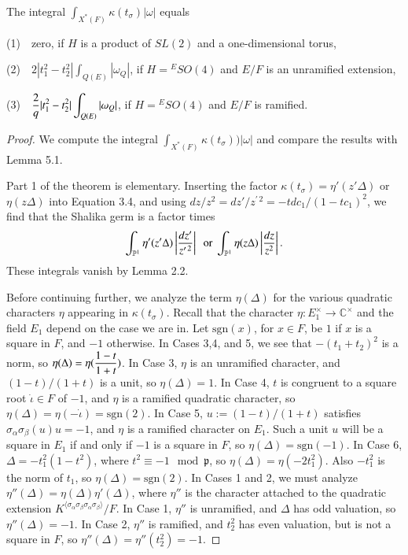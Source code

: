 \documentclass{amsart}
\newcommand\jota{{\dot\iota}}
\newcommand\bP{{\mathbb P}}
\newcommand\pp{{\mathfrak p}}
\newcommand\C{{\mathbb C}}
\newenvironment{cthm}[1]
  {\renewcommand\thethm{\bf #1}\thm}
  {\endthm}
\begin{document}
\bigskip
\noindent
\begin{cthm}{Theorem 5.2} The integral 
$\int_{X^*(F)} \kappa(t_\sigma)|\omega|$ equals

\noindent
(1)\ \
  zero, if $H$ is a product of $SL(2)$ and a one-dimensional torus,

\noindent
(2)\ \  $\displaystyle 2 |t_1^2-t_2^2| \int_{Q(E)} |\omega_Q|$, if
$H = {}^ESO(4)$ and $E/F$ is an unramified extension,

\noindent
(3)\ \  $\displaystyle{2\over q} |t_1^2-t_2^2| \int_{Q(E)} |\omega_Q|$, if
$H = {}^ESO(4)$ and $E/F$ is ramified.
\end{cthm}

\bigskip
\noindent
\begin{proof}  We compute the integral $\int_{X^*(F)} \kappa(t_\sigma))
|\omega|$ and compare the results with Lemma 5.1.

Part 1 of the theorem is elementary.
Inserting the factor $\kappa(t_\sigma) = \eta'(z'\Delta)$ or
$\eta(z\Delta)$
into
Equation 3.4, and using $dz/z^2= dz'/z^{\prime\,2}
 = -t dc_1/(1 - t c_1)^2$, we find
that the Shalika germ is a factor times
$$ \int_{\bP^1} \eta'(z' \Delta) \left|
{ dz'\over z^{\prime\,2}}\right | \ \text{ or }
\int_{\bP^1} \eta(z \Delta) \left|
{ dz\over z^2}\right |.$$
These integrals vanish by Lemma 2.2.

Before continuing further, we analyze the term $\eta(\Delta)$
for the various quadratic characters $\eta$ appearing in
$\kappa(t_\sigma)$.  Recall that the character 
$\eta:E_1^\times\to\C^\times$ and the field $E_1$ 
depend on the case we are in.  Let $\text{sgn}(x)$, for
$x\in F$, be $1$ if $x$ is a square in $F$, and $-1$
otherwise.
In Cases 3,4, and 5, we see that $-(t_1+t_2)^2$ is a norm,
so $\eta(\Delta)=\eta(\displaystyle{1-t\over 1+t})$.
In Case 3, $\eta$ is an unramified character, and
$(1-t)/(1+t)$ is a unit, so $\eta(\Delta)=1$.  In Case 4,
$t$ is congruent to a square root $\jota\in F$ of $-1$, and
$\eta$ is a ramified quadratic character, so
$\eta(\Delta)=\eta(-\jota) = \text{sgn}(2)$.  In Case 5,
$u:= (1-t)/(1+t)$ satisfies $\sigma_{\alpha}\sigma_\beta(u)u= -1$,
and $\eta$ is a ramified character on $E_1$.  Such a unit 
$u$ will be a square in $E_1$ if and only if $-1$ is a square in $F$,
so $\eta(\Delta) = \text{sgn}(-1)$.
In Case 6, $\Delta = -t_1^2 (1-t^2)$,
where $t^2 \equiv -1 \mod\pp$, so $\eta(\Delta) =\eta(-2t_1^2)$.
Also $-t_1^2$ is the norm of $t_1$, so $\eta(\Delta) = \text{sgn}(2)$.
In Cases 1 and 2, we must analyze 
$\eta''(\Delta)=\eta(\Delta)\eta'(\Delta) $,
where $\eta''$ is the character attached to the quadratic
extension $K^{\langle\sigma_\alpha\sigma_\beta\sigma_\alpha\sigma_\beta\rangle}/F$.  
In Case 1, $\eta''$ is unramified, and $\Delta$ has odd
valuation, so $\eta''(\Delta) = -1$.  In Case 2, $\eta''$ is
ramified, and $t_2^2$ has even valuation, but is not a square
in $F$,
so $\eta''(\Delta) = \eta''(t_2^2) = -1$.


\end{proof}
\end{document}

